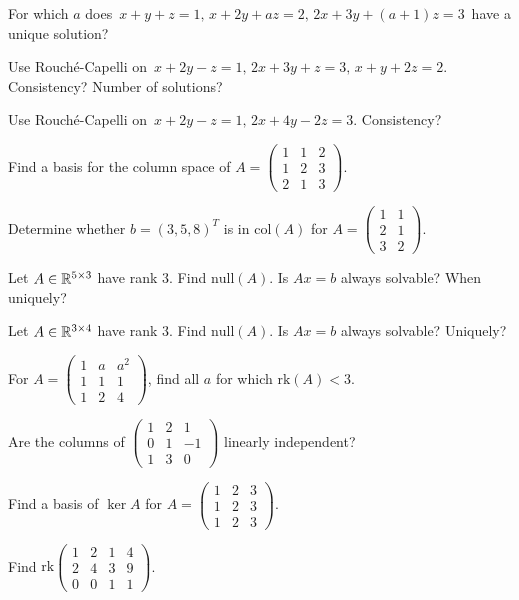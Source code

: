 \begin{problems}
    \item For which $a$ does $\,x + y + z = 1, \, x + 2 y + a z = 2,\, 2 x + 3 y + (a + 1) z = 3\,$ have a unique solution?
    \item Use Rouché-Capelli on $\,x + 2 y - z = 1,\, 2 x + 3 y + z = 3,\, x + y + 2 z = 2$. Consistency? Number of solutions?
    \item Use Rouché-Capelli on $\,x + 2 y - z = 1,\, 2 x + 4 y - 2 z = 3$. Consistency?
    \item Find a basis for the column space of $A = \begin{pmatrix} 1 & 1 & 2 \\ 1 & 2 & 3 \\ 2 & 1 & 3 \end{pmatrix}$.
    \item Determine whether $b = (3, 5, 8)^{T}$ is in $\mathrm{col}(A)$ for $A = \begin{pmatrix} 1 & 1 \\ 2 & 1 \\ 3 & 2 \end{pmatrix}$.
    \item Let $A \in \mathbb{R}^{5 \times 3}$ have rank $3$. Find $\mathrm{null}(A)$. Is $A x = b$ always solvable? When uniquely?
    \item Let $A \in \mathbb{R}^{3 \times 4}$ have rank $3$. Find $\mathrm{null}(A)$. Is $A x = b$ always solvable? Uniquely?
    \item For $A = \begin{pmatrix} 1 & a & a^{2} \\ 1 & 1 & 1 \\ 1 & 2 & 4 \end{pmatrix}$, find all $a$ for which $\mathrm{rk}(A) < 3$.
    \item Are the columns of $\begin{pmatrix} 1 & 2 & 1 \\ 0 & 1 & -1 \\ 1 & 3 & 0 \end{pmatrix}$ linearly independent?
    \item Find a basis of $\ker A$ for $A = \begin{pmatrix} 1 & 2 & 3 \\ 1 & 2 & 3 \\ 1 & 2 & 3 \end{pmatrix}$.
    \item Find $\mathrm{rk}\begin{pmatrix} 1 & 2 & 1 & 4 \\ 2 & 4 & 3 & 9 \\ 0 & 0 & 1 & 1 \end{pmatrix}$.

\end{problems}
